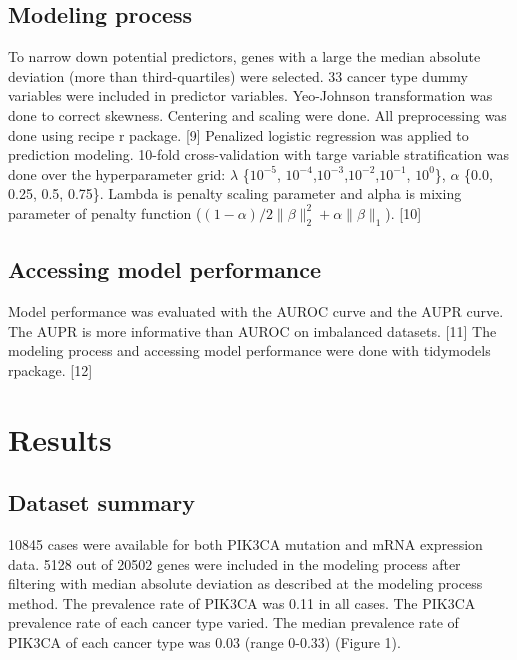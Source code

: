 \documentclass[10pt,letterpaper]{article}
\begin{document}
\hypertarget{modeling-process}{%
\subsection{Modeling process}\label{modeling-process}}

To narrow down potential predictors, genes with a large the median
absolute deviation (more than third-quartiles) were selected. 33 cancer
type dummy variables were included in predictor variables. Yeo-Johnson
transformation was done to correct skewness. Centering and scaling were
done. All preprocessing was done using recipe r package. {[}9{]}
Penalized logistic regression was applied to prediction modeling.
10-fold cross-validation with targe variable stratification was done
over the hyperparameter grid: \(\lambda\) \{\(10^{-5}\),
\(10^{-4}\),\(10^{-3}\),\(10^{-2}\),\(10^{-1}\), \(10^{0}\)\},
\(\alpha\) \{0.0, 0.25, 0.5, 0.75\}. Lambda is penalty scaling parameter
and alpha is mixing parameter of penalty function
(\((1-\alpha)/2 \lVert\beta\rVert_2^2+\alpha\lVert \beta \rVert_1\)).
{[}10{]}

\hypertarget{accessing-model-performance}{%
\subsection{Accessing model
performance}\label{accessing-model-performance}}

Model performance was evaluated with the AUROC curve and the AUPR curve.
The AUPR is more informative than AUROC on imbalanced datasets. {[}11{]}
The modeling process and accessing model performance were done with
tidymodels rpackage. {[}12{]}

\hypertarget{results}{%
\section{Results}\label{results}}

\hypertarget{dataset-summary}{%
\subsection{Dataset summary}\label{dataset-summary}}

10845 cases were available for both PIK3CA mutation and mRNA expression
data. 5128 out of 20502 genes were included in the modeling process
after filtering with median absolute deviation as described at the
modeling process method. The prevalence rate of PIK3CA was 0.11 in all
cases. The PIK3CA prevalence rate of each cancer type varied. The median
prevalence rate of PIK3CA of each cancer type was 0.03 (range 0-0.33)
(Figure 1).
\end{document}
